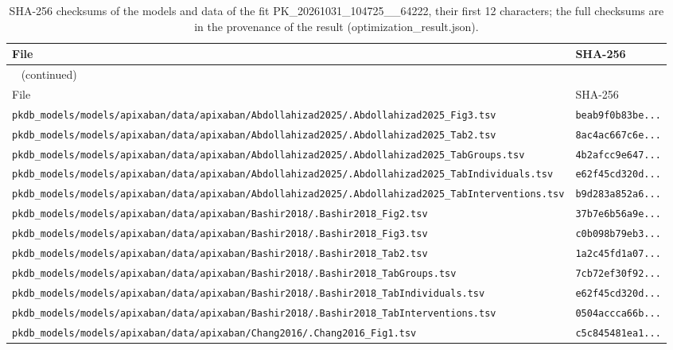 \begin{longtable}{ll}
\caption{SHA-256 checksums of the models and data of the fit PK\_20261031\_104725\_\_64222, their first 12 characters; the full checksums are in the provenance of the result (optimization\_result.json).}\label{tab:checksums:PK_20261031_104725__64222} \\
\toprule
File & SHA-256 \\
\midrule
\endfirsthead
\multicolumn{2}{l}{\small\tablename~\thetable{} (continued)} \\
\toprule
File & SHA-256 \\
\midrule
\endhead
\bottomrule
\endlastfoot
\texttt{pkdb\_models/models/apixaban/data/apixaban/Abdollahizad2025/.Abdollahizad2025\_Fig3.tsv} & \texttt{beab9f0b83be...} \\
\texttt{pkdb\_models/models/apixaban/data/apixaban/Abdollahizad2025/.Abdollahizad2025\_Tab2.tsv} & \texttt{8ac4ac667c6e...} \\
\texttt{pkdb\_models/models/apixaban/data/apixaban/Abdollahizad2025/.Abdollahizad2025\_TabGroups.tsv} & \texttt{4b2afcc9e647...} \\
\texttt{pkdb\_models/models/apixaban/data/apixaban/Abdollahizad2025/.Abdollahizad2025\_TabIndividuals.tsv} & \texttt{e62f45cd320d...} \\
\texttt{pkdb\_models/models/apixaban/data/apixaban/Abdollahizad2025/.Abdollahizad2025\_TabInterventions.tsv} & \texttt{b9d283a852a6...} \\
\texttt{pkdb\_models/models/apixaban/data/apixaban/Bashir2018/.Bashir2018\_Fig2.tsv} & \texttt{37b7e6b56a9e...} \\
\texttt{pkdb\_models/models/apixaban/data/apixaban/Bashir2018/.Bashir2018\_Fig3.tsv} & \texttt{c0b098b79eb3...} \\
\texttt{pkdb\_models/models/apixaban/data/apixaban/Bashir2018/.Bashir2018\_Tab2.tsv} & \texttt{1a2c45fd1a07...} \\
\texttt{pkdb\_models/models/apixaban/data/apixaban/Bashir2018/.Bashir2018\_TabGroups.tsv} & \texttt{7cb72ef30f92...} \\
\texttt{pkdb\_models/models/apixaban/data/apixaban/Bashir2018/.Bashir2018\_TabIndividuals.tsv} & \texttt{e62f45cd320d...} \\
\texttt{pkdb\_models/models/apixaban/data/apixaban/Bashir2018/.Bashir2018\_TabInterventions.tsv} & \texttt{0504accca66b...} \\
\texttt{pkdb\_models/models/apixaban/data/apixaban/Chang2016/.Chang2016\_Fig1.tsv} & \texttt{c5c845481ea1...} \\

\end{longtable}
